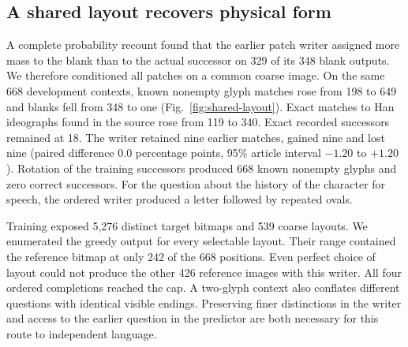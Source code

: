 \subsection*{A shared layout recovers physical form}
A complete probability recount found that the earlier patch writer assigned
more mass to the blank than to the actual successor on 329 of its 348 blank
outputs. We therefore conditioned all patches on a common coarse image.
On the same 668 development contexts, known nonempty glyph matches rose from
198 to 649 and blanks fell from 348 to one (Fig.~\ref{fig:shared-layout}).
Exact matches to Han ideographs found in the source rose from 119 to 340.
Exact recorded successors remained at 18. The writer retained nine earlier
matches, gained nine and lost nine (paired difference 0.0 percentage points,
95\% article interval $-1.20$ to $+1.20$). Rotation of the training
successors produced 668 known nonempty glyphs and zero correct successors.
For the question about the history of the character for speech, the ordered
writer produced a letter followed by repeated ovals.

Training exposed 5,276 distinct target bitmaps and 539 coarse layouts.
We enumerated the greedy output for every selectable layout. Their range
contained the reference bitmap at only 242 of the 668 positions. Even perfect
choice of layout could not produce the other 426 reference images with this
writer. All four ordered completions reached the cap. A two-glyph context
also conflates different questions with identical visible endings. Preserving
finer distinctions in the writer and access to the earlier question in the
predictor are both necessary for this route to independent language.

